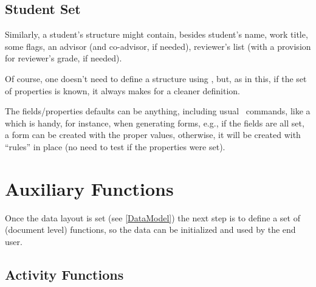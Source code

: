 \documentclass[10pt]{article}
\begin{document}
\subsection{Student Set}
Similarly, a student's structure might contain, besides student's name, work title, some flags, an advisor (and co-advisor, if needed), reviewer's list (with a provision for reviewer's grade, if needed).

Of course, one doesn't need to define a  structure using , but, as in this,  if the set of properties is known, it always makes for a cleaner definition.

\begin{tsremark}
  The fields/properties defaults can be anything, including usual \LaTeXe\  commands, like a \tsobj{\rule} which is handy, for instance, when generating forms, e.g., if the fields are all set, a form can be created with the proper values, otherwise, it will be  created with ``rules'' in place (no need to test if the properties were set).
\end{tsremark}




\section{Auxiliary Functions}
Once the data layout is set (see \ref{DataModel}) the next step is to define a set of (document level) functions, so the data can be initialized and used by the end user.

\subsection{Activity Functions}

\end{document}
